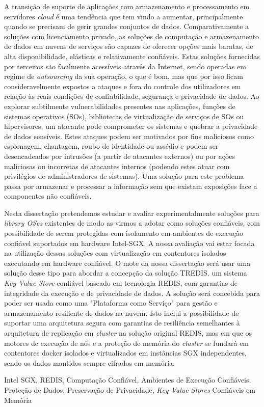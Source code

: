A transição de suporte de aplicações com armazenamento e processamento em servidores \textit{cloud} é uma tendência que tem vindo a aumentar, principalmente quando se precisam de gerir grandes conjuntos de dados. Comparativamente a soluções com licenciamento privado, as soluções de computação e armazenamento de dados em nuvens de serviços são capazes de oferecer opções mais baratas, de alta disponibilidade, elásticas e relativamente confiáveis. Estas soluções fornecidas por terceiros são facilmente acessíveis através da Internet, sendo operadas em regime de \textit{outsourcing} da sua operação, o que é bom, mas que por isso ficam consideravelmente expostos a ataques e fora do controle dos utilizadores em relação às reais condições de confiabilidade, segurança e privacidade de dados. Ao explorar subtilmente vulnerabilidades presentes nas aplicações, funções de sistemas operativos (SOs), bibliotecas de virtualização de serviços de SOs ou hipervisores, um atacante pode comprometer os sistemas e quebrar a privacidade de dados sensíveis. Estes ataques podem ser motivados por fins maliciosos como espionagem, chantagem, roubo de identidade ou assédio e podem ser desencadeados por intrusões (a partir de atacantes externos) ou por ações maliciosas ou incorretas de atacantes internos (podendo estes atuar com privilégios de administradores de sistemas). Uma solução para este problema passa por armazenar e processar a informação sem que existam exposições face a componentes não confiáveis. 

Nesta dissertação pretendemos estudar e avaliar experimentalmente soluções para \textit{library OSes} existentes de modo as virmos a adotar como soluções confiáveis, com possibilidade de serem protegidas com isolamento em ambientes de execução confiável suportados em hardware Intel-SGX. A nossa avaliação vai estar focada na utilização dessas soluções com virtualização em contentores isolados executando em hardware confiável. O mote da nossa dissertação será usar uma solução desse tipo para abordar a concepção da solução TREDIS. um sistema \textit{Key-Value Store} confiável baseado em tecnologia REDIS, com garantias de integridade da execução e de privacidade de dados. A solução será concebida para poder ser usada como uma "Plataforma como Serviço" para gestão e armazenamento resiliente de dados na nuvem. Isto inclui a possibilidade de suportar uma arquitetura segura com garantias de resiliência semelhantes à arquitetura de replicação em \textit{cluster} na solução original REDIS, mas em que os motores de execução de nós e a proteção de memória do \textit{cluster} se fundará em contentores docker isolados e virtualizados em instâncias SGX independentes, sendo os dados mantidos sempre cifrados em memória.

 
	
\begin{keywords}
 Intel SGX, REDIS, Computação Confiável, Ambientes de Execução Confiáveis, Proteção de Dados, Preservação de Privacidade, \textit{Key-Value Stores} Confiáveis em Memória
\end{keywords}


	
